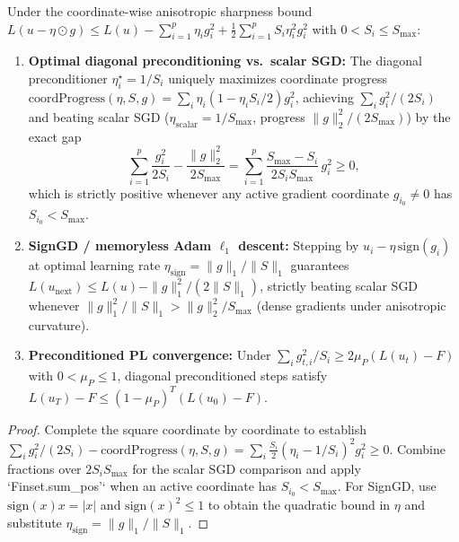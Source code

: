 \begin{lemma}\label{lem:preconditioned_descent}
\leanok
{}
Under the coordinate-wise anisotropic sharpness bound $L(u - \eta\odot g) \le L(u) - \sum_{i=1}^p \eta_i g_i^2 + \frac{1}{2}\sum_{i=1}^p S_i \eta_i^2 g_i^2$ with $0 < S_i \le S_{\max}$:
\begin{enumerate}
\item \textbf{Optimal diagonal preconditioning vs.\ scalar SGD:} The diagonal preconditioner $\eta_i^\star = 1/S_i$ uniquely maximizes coordinate progress $\mathrm{coordProgress}(\eta, S, g) = \sum_i \eta_i(1 - \eta_i S_i/2)g_i^2$, achieving $\sum_i g_i^2/(2S_i)$ and beating scalar SGD ($\eta_{\mathrm{scalar}} = 1/S_{\max}$, progress $\|g\|_2^2/(2S_{\max})$) by the exact gap
\[
\sum_{i=1}^p \frac{g_i^2}{2S_i} - \frac{\|g\|_2^2}{2S_{\max}} = \sum_{i=1}^p \frac{S_{\max} - S_i}{2 S_i S_{\max}}\,g_i^2 \ge 0,
\]
which is strictly positive whenever any active gradient coordinate $g_{i_0}\ne 0$ has $S_{i_0} < S_{\max}$.
\item \textbf{SignGD / memoryless Adam $\ell_1$ descent:} Stepping by $u_i - \eta\,\mathrm{sign}(g_i)$ at optimal learning rate $\eta_{\mathrm{sign}} = \|g\|_1 / \|S\|_1$ guarantees $L(u_{\mathrm{next}}) \le L(u) - \|g\|_1^2 / (2\|S\|_1)$, strictly beating scalar SGD whenever $\|g\|_1^2 / \|S\|_1 > \|g\|_2^2 / S_{\max}$ (dense gradients under anisotropic curvature).
\item \textbf{Preconditioned PL convergence:} Under $\sum_i g_{t,i}^2 / S_i \ge 2\mu_P(L(u_t)-F)$ with $0 < \mu_P \le 1$, diagonal preconditioned steps satisfy $L(u_T) - F \le (1-\mu_P)^T(L(u_0)-F)$.
\end{enumerate}
\end{lemma}
\begin{proof}
\leanok
Complete the square coordinate by coordinate to establish $\sum_i g_i^2/(2S_i) - \mathrm{coordProgress}(\eta,S,g) = \sum_i \frac{S_i}{2}(\eta_i - 1/S_i)^2 g_i^2 \ge 0$. Combine fractions over $2 S_i S_{\max}$ for the scalar SGD comparison and apply `Finset.sum_pos'` when an active coordinate has $S_{i_0} < S_{\max}$. For SignGD, use $\mathrm{sign}(x)x = |x|$ and $\mathrm{sign}(x)^2 \le 1$ to obtain the quadratic bound in $\eta$ and substitute $\eta_{\mathrm{sign}} = \|g\|_1/\|S\|_1$.
\end{proof}

